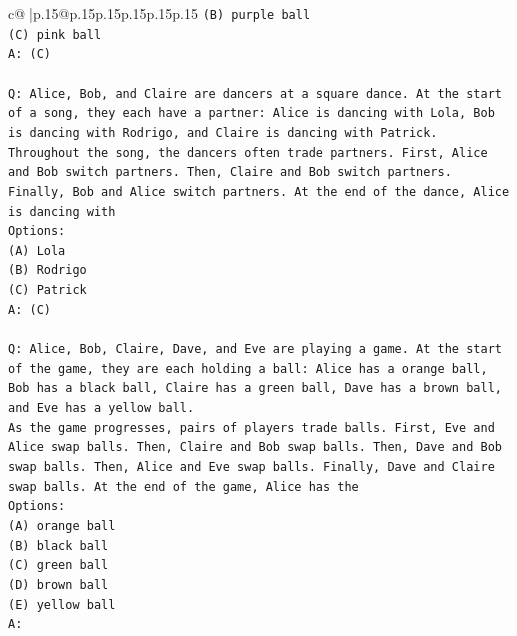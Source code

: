 \documentclass{article}
\begin{document}
{\begin{supertabular}{c@{$\;$}|p{.15\linewidth}@{}p{.15\linewidth}p{.15\linewidth}p{.15\linewidth}p{.15\linewidth}p{.15\linewidth}}
{{{\texttt{(B) purple ball} \\
\texttt{(C) pink ball} \\
\texttt{A: (C)} \\
\\ 
\texttt{Q: Alice, Bob, and Claire are dancers at a square dance. At the start of a song, they each have a partner: Alice is dancing with Lola, Bob is dancing with Rodrigo, and Claire is dancing with Patrick.} \\
\texttt{Throughout the song, the dancers often trade partners. First, Alice and Bob switch partners. Then, Claire and Bob switch partners. Finally, Bob and Alice switch partners. At the end of the dance, Alice is dancing with} \\
\texttt{Options:} \\
\texttt{(A) Lola} \\
\texttt{(B) Rodrigo} \\
\texttt{(C) Patrick} \\
\texttt{A: (C)} \\
\\ 
\texttt{Q: Alice, Bob, Claire, Dave, and Eve are playing a game. At the start of the game, they are each holding a ball: Alice has a orange ball, Bob has a black ball, Claire has a green ball, Dave has a brown ball, and Eve has a yellow ball.} \\
\texttt{As the game progresses, pairs of players trade balls. First, Eve and Alice swap balls. Then, Claire and Bob swap balls. Then, Dave and Bob swap balls. Then, Alice and Eve swap balls. Finally, Dave and Claire swap balls. At the end of the game, Alice has the} \\
\texttt{Options:} \\
\texttt{(A) orange ball} \\
\texttt{(B) black ball} \\
\texttt{(C) green ball} \\
\texttt{(D) brown ball} \\
\texttt{(E) yellow ball} \\
\texttt{A:} \\
            }
        }
    }
     \\ \\


\end{supertabular}}
\end{document}
